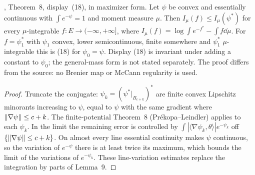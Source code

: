 \begin{theorem}
  \label{thm:cek-prekopa-maximality}
  \leanok
  \cite{CorderoKlartag2015}, Theorem~8, display~(18), in maximizer form. Let $\psi$ be convex and essentially continuous
  with $\int e^{-\psi}=1$ and moment measure $\mu$. Then $I_\mu(f)\le I_\mu(\psi^*)$ for every $\mu$-integrable
  $f\colon E\to(-\infty,+\infty]$, where $I_\mu(f)=\log\int e^{-f^*}-\int f\dd\mu$. For $f=\psi_1^*$ with $\psi_1$
  convex, lower semicontinuous, finite somewhere and $\psi_1^*$ $\mu$-integrable this is (18) for $\psi_0=\psi$. Display
  (18) is invariant under adding a constant to $\psi_0$; the general-mass form is not stated separately. The proof
  differs from the source: no Brenier map or McCann regularity is used.
\end{theorem}
\begin{proof}
  \leanok
  Truncate the conjugate: $\psi_k=(\psi^*|_{B_{c+k}})^*$ are finite convex Lipschitz minorants increasing to $\psi$, equal
  to $\psi$ with the same gradient where $\lVert\nabla\psi\rVert\le c+k$. The finite-potential Theorem~8 (Pr\'ekopa--Leindler)
  applies to each $\psi_k$. In the limit the remaining error is controlled by $\int|\langle\nabla\psi_k,\theta\rangle|
  e^{-\psi_k}$ off $\{\lVert\nabla\psi\rVert\le c+k\}$. On almost every line essential continuity makes $\psi$ continuous, so
  the variation of $e^{-\psi}$ there is at least twice its maximum, which bounds the limit of the variations of
  $e^{-\psi_k}$. These line-variation estimates replace the integration by parts of Lemma~9.
\end{proof}

